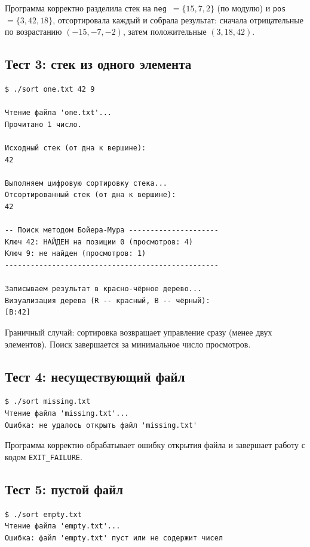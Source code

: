 \documentclass[a4paper,14pt]{extarticle}
\begin{document}
Программа корректно разделила стек на \texttt{neg}~$=\{15, 7, 2\}$ (по модулю) и \texttt{pos}~$=\{3, 42, 18\}$, отсортировала каждый и собрала результат: сначала отрицательные по возрастанию $(-15, -7, -2)$, затем положительные $(3, 18, 42)$.

\subsection{Тест 3: стек из одного элемента}

\begin{Verbatim}[frame=single,fontsize=\footnotesize]
$ ./sort one.txt 42 9

Чтение файла 'one.txt'...
Прочитано 1 число.

Исходный стек (от дна к вершине):
42

Выполняем цифровую сортировку стека...
Отсортированный стек (от дна к вершине):
42

-- Поиск методом Бойера-Мура ---------------------
Ключ 42: НАЙДЕН на позиции 0 (просмотров: 4)
Ключ 9: не найден (просмотров: 1)
--------------------------------------------------

Записываем результат в красно-чёрное дерево...
Визуализация дерева (R -- красный, B -- чёрный):
[B:42]
\end{Verbatim}

Граничный случай: сортировка возвращает управление сразу (менее двух элементов). Поиск завершается за минимальное число просмотров.

\subsection{Тест 4: несуществующий файл}

\begin{Verbatim}[frame=single,fontsize=\footnotesize]
$ ./sort missing.txt
Чтение файла 'missing.txt'...
Ошибка: не удалось открыть файл 'missing.txt'
\end{Verbatim}

Программа корректно обрабатывает ошибку открытия файла и завершает работу с кодом \texttt{EXIT\_FAILURE}.

\subsection{Тест 5: пустой файл}

\begin{Verbatim}[frame=single,fontsize=\footnotesize]
$ ./sort empty.txt
Чтение файла 'empty.txt'...
Ошибка: файл 'empty.txt' пуст или не содержит чисел
\end{Verbatim}
\end{document}
